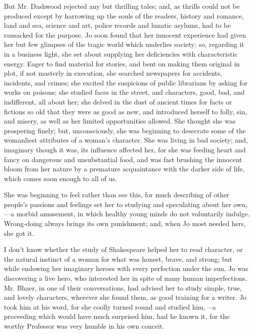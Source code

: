 But Mr. Dashwood rejected any but thrilling tales; and, as thrills could
not be produced except by harrowing up the souls of the readers, history
and romance, land and sea, science and art, police records and lunatic
asylums, had to be ransacked for the purpose. Jo soon found that her
innocent experience had given her but few glimpses of the tragic world
which underlies society; so, regarding it in a business light, she set
about supplying her deficiencies with characteristic energy. Eager to
find material for stories, and bent on making them original in plot, if
not masterly in execution, she searched newspapers for accidents,
incidents, and crimes; she excited the suspicions of public librarians
by asking for works on poisons; she studied faces in the street, and
characters, good, bad, and indifferent, all about her; she delved in the
dust of ancient times for facts or fictions so old that they were as
good as new, and introduced herself to folly, sin, and misery, as well
as her limited opportunities allowed. She thought she was prospering
finely; but, unconsciously, she was beginning to desecrate some of the
womanliest attributes of a woman's character. She was
living in bad society; and, imaginary though it was, its influence
affected her, for she was feeding heart and fancy on dangerous and
unsubstantial food, and was fast brushing the innocent bloom from her
nature by a premature acquaintance with the darker side of life, which
comes soon enough to all of us.

She was beginning to feel rather than see this, for much describing of
other people's passions and feelings set her to studying
and speculating about her own,---a morbid amusement, in which healthy
young minds do not voluntarily indulge. Wrong-doing always brings its
own punishment; and, when Jo most needed hers, she got it.

I don't know whether the study of Shakespeare helped her
to read character, or the natural instinct of a woman for what was
honest, brave, and strong; but while endowing her imaginary heroes with
every perfection under the sun, Jo was discovering a live hero, who
interested her in spite of many human imperfections. Mr. Bhaer, in one
of their conversations, had advised her to study simple, true, and
lovely characters, wherever she found them, as good training for a
writer. Jo took him at his word, for she coolly turned round and studied
him,---a proceeding which would have much surprised him, had he known
it, for the worthy Professor was very humble in his own conceit.

